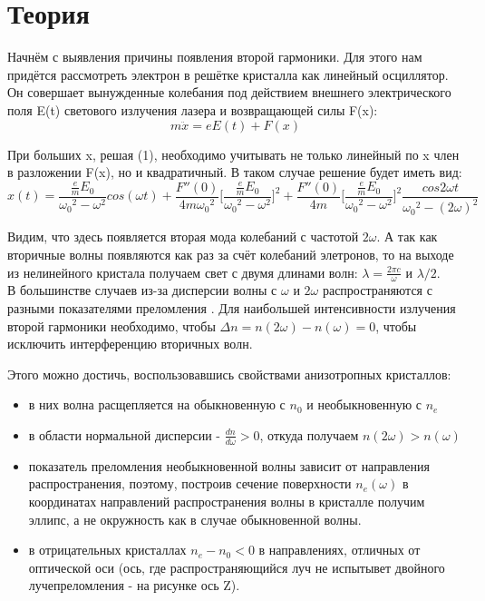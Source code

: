 \documentclass[a4paper,14pt]{article} %
\begin{document}


\newpage

\section{Теория}
Начнём с выявления причины появления второй гармоники. Для этого нам придётся рассмотреть электрон в решётке кристалла как линейный осциллятор. Он совершает вынужденные колебания под действием внешнего электрического поля E(t) светового излучения лазера и возвращающей силы F(x):\\
\begin{equation}
m \ddot{x} = e E(t) + F(x)
\end{equation}

При больших x, решая (1), необходимо учитывать не только линейный по x член в разложении F(x), но и квадратичный. В таком случае решение будет иметь вид:
\begin{equation}
x(t) = \frac{\frac{e}{m} E_0}{{\omega_0}^2 - {\omega}^2} cos(\omega t) 
+ \frac{F''(0)}{4m {\omega_0}^2} \Big[\frac{\frac{e}{m} E_0}{{\omega_0}^2 - {\omega}^2}\Big]^2
+ \frac{F''(0)}{4m} \Big[\frac{\frac{e}{m} E_0}{{\omega_0}^2 - {\omega}^2}\Big]^2
\frac{cos2\omega t}{{\omega_0}^2 - (2 \omega)^2}
\end{equation}

Видим, что здесь появляется вторая мода колебаний с частотой $2 \omega$. А так как вторичные волны появляются как раз за счёт колебаний элетронов, то на выходе из нелинейного кристала получаем свет с двумя длинами волн: $\lambda = \frac{2 \pi c}{\omega}$ и $\lambda / 2$.\\

В большинстве случаев из-за дисперсии волны с $\omega$ и $2 \omega$ распространяются с разными показателями преломления . Для наибольшей интенсивности излучения второй гармоники необходимо, чтобы $\Delta n = n(2 \omega) - n(\omega) = 0$, чтобы исключить интерференцию вторичных волн.

Этого можно достичь, воспользовавшись свойствами анизотропных кристаллов:
\begin{itemize}
\item в них волна расщепляется на обыкновенную с $n_0$ и необыкновенную с $n_e$
\item в области нормальной дисперсии - $\frac{dn}{d \omega} > 0$, откуда получаем $n(2 \omega) > n(\omega)$
\item показатель преломления необыкновенной волны зависит от направления распространения, поэтому, построив сечение поверхности $n_e(\omega)$ в координатах направлений распространения волны в кристалле получим эллипс, а не окружность как в случае обыкновенной волны.
\item в отрицательных кристаллах $n_e - n_0 < 0$ в направлениях, отличных от оптической оси (ось, где распространяющийся луч не испытывет двойного лучепреломления - на рисунке ось Z).
\end{itemize}
\end{document}
